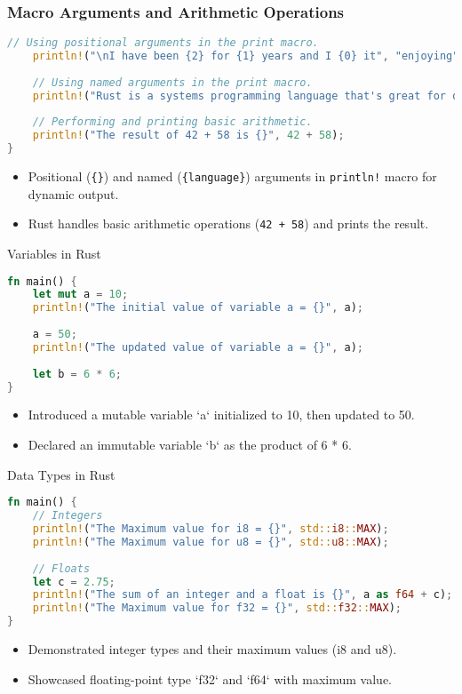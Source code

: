 \documentclass[aspectratio=169, table]{beamer}
\begin{document}
\begin{frame}[fragile]
\frametitle{Macro Arguments and Arithmetic Operations}
\vspace{10pt}
\begin{lstlisting}[language=Rust]
	// Using positional arguments in the print macro.
	println!("\nI have been {2} for {1} years and I {0} it", "enjoying", 15, "coding");
	
	// Using named arguments in the print macro.
	println!("Rust is a systems programming language that's great for development.");
	
	// Performing and printing basic arithmetic.
	println!("The result of 42 + 58 is {}", 42 + 58);
}
\end{lstlisting}
\begin{itemize}
\item Positional (\texttt{\{\}}) and named (\texttt{\{language\}}) arguments in \texttt{println!} macro for dynamic output.
\item Rust handles basic arithmetic operations (\texttt{42 + 58}) and prints the result.
\end{itemize}
\end{frame}

\begin{frame}[fragile]{Variables in Rust}
\begin{lstlisting}[language=Rust]
fn main() {
	let mut a = 10;
	println!("The initial value of variable a = {}", a);
	
	a = 50;
	println!("The updated value of variable a = {}", a);
	
	let b = 6 * 6;
}
\end{lstlisting}
\begin{itemize}
\item Introduced a mutable variable `a` initialized to 10, then updated to 50.
\item Declared an immutable variable `b` as the product of 6 * 6.
\end{itemize}
\end{frame}


\begin{frame}[fragile]{Data Types in Rust}
\vspace{10pt}
\begin{lstlisting}[language=Rust]
fn main() {
	// Integers
	println!("The Maximum value for i8 = {}", std::i8::MAX);
	println!("The Maximum value for u8 = {}", std::u8::MAX);
	
	// Floats
	let c = 2.75;
	println!("The sum of an integer and a float is {}", a as f64 + c);
	println!("The Maximum value for f32 = {}", std::f32::MAX);
}
\end{lstlisting}
\begin{itemize}
\item Demonstrated integer types and their maximum values (i8 and u8).
\item Showcased floating-point type `f32` and `f64` with maximum value.
\end{itemize}
\end{frame}
\end{document}

